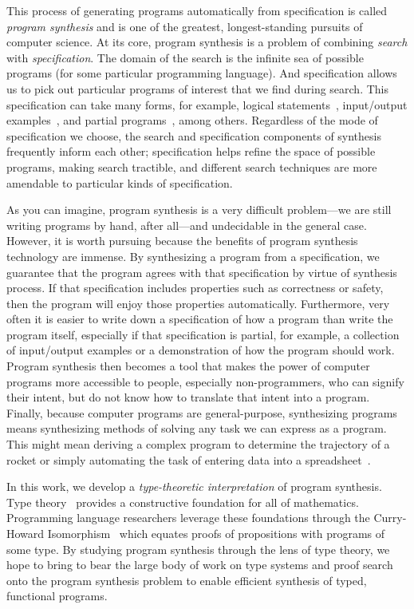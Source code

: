 This process of generating programs automatically from specification is called \emph{program synthesis} and is one of the greatest, longest-standing pursuits of computer science.
At its core, program synthesis is a problem of combining \emph{search} with \emph{specification}.
The domain of the search is the infinite sea of possible programs (for some particular programming language).
And specification allows us to pick out particular programs of interest that we find during search.
This specification can take many forms, for example, logical statements~\citep{green-ijcai-1969, manna-tse-1979}, input/output examples~\citep{summers-popl-1976, kitzelmann-thesis-2010, albarghouthi-cav-2013, feser-pldi-2015}, and partial programs~\citep{solar-lezama-thesis-2008, alur-fmcad-2013, singh-pldi-2013}, among others.
Regardless of the mode of specification we choose, the search and specification components of synthesis frequently inform each other; specification helps refine the space of possible programs, making search tractible, and different search techniques are more amendable to particular kinds of specification.

As you can imagine, program synthesis is a very difficult problem---we are still writing programs by hand, after all---and undecidable in the general case.
However, it is worth pursuing because the benefits of program synthesis technology are immense.
By synthesizing a program from a specification, we guarantee that the program agrees with that specification by virtue of synthesis process.
If that specification includes properties such as correctness or safety, then the program will enjoy those properties automatically.
Furthermore, very often it is easier to write down a specification of how a program than write the program itself, especially if that specification is partial, for example, a collection of input/output examples or a demonstration of how the program should work.
Program synthesis then becomes a tool that makes the power of computer programs more accessible to people, especially non-programmers, who can signify their intent, but do not know how to translate that intent into a program.
Finally, because computer programs are general-purpose, synthesizing programs means synthesizing methods of solving any task we can express as a program.
This might mean deriving a complex program to determine the trajectory of a rocket or simply automating the task of entering data into a spreadsheet~\citep{gulwani-popl-2011}.

In this work, we develop a \emph{type-theoretic interpretation} of program synthesis.
Type theory~\citep{martin-lof-1984} provides a constructive foundation for all of mathematics.
Programming language researchers leverage these foundations through the Curry-Howard Isomorphism~\citep{william-curry-1980} which equates proofs of propositions with programs of some type.
By studying program synthesis through the lens of type theory, we hope to bring to bear the large body of work on type systems and proof search onto the program synthesis problem to enable efficient synthesis of typed, functional programs.

